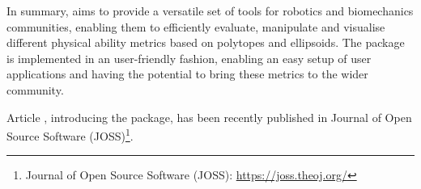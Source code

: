 In summary,  aims to provide a versatile set of tools for robotics and biomechanics communities, enabling them to efficiently evaluate, manipulate and visualise different physical ability metrics based on polytopes and ellipsoids. The package is implemented in an user-friendly fashion, enabling an easy setup of user applications and having the potential to bring these metrics to the wider community. 

Article \citet{pycapacity}, introducing the  package, has been recently published in Journal of Open Source Software (JOSS)\footnote{Journal of Open Source Software (JOSS): \url{https://joss.theoj.org/}}.